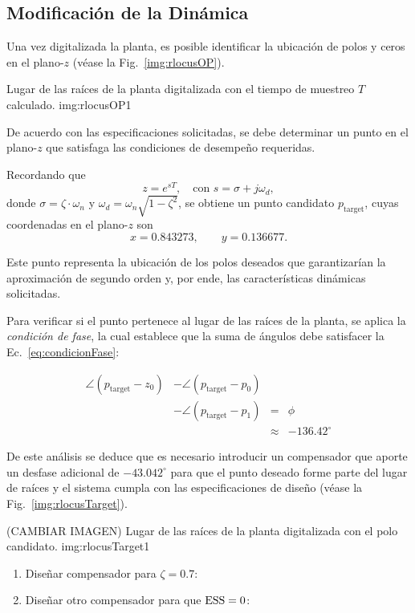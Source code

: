 \subsection{Modificaci\'on de la Din\'amica}

Una vez digitalizada la planta, es posible identificar la ubicaci\'on de polos y ceros en el plano-$z$ (v\'ease la Fig.~\ref{img:rlocusOP}).  

{Lugar de las ra\'ices de la planta digitalizada con el tiempo de muestreo $T$ calculado.}
{img:rlocusOP}{1}

De acuerdo con las especificaciones solicitadas, se debe determinar un punto en el plano-$z$ que satisfaga las condiciones de desempe\~no requeridas.  

Recordando que 
\[
z = e^{sT}, \quad \text{con } s = \sigma + j\omega_d,
\]
donde $\sigma = \zeta \cdot \omega_n$ y $\omega_d = \omega_n \sqrt{1-\zeta^2}$,
se obtiene un punto candidato $p_{\text{target}}$, cuyas coordenadas en el plano-$z$ son
\[
x = 0.843273, \qquad y = 0.136677.
\]

Este punto representa la ubicaci\'on de los polos deseados que garantizar\'ian la aproximaci\'on de segundo orden y, por ende, las caracter\'isticas din\'amicas solicitadas.  

Para verificar si el punto pertenece al lugar de las ra\'ices de la planta, se aplica la \emph{condici\'on de fase}, la cual establece que la suma de \'angulos debe satisfacer la Ec.~\eqref{eq:condicionFase}:

\begin{equation}
	\begin{aligned}
		\angle (p_{\text{target}}-z_0) 
		&- \angle (p_{\text{target}}-p_0) \\
		&- \angle (p_{\text{target}}-p_1) 
		&=& \phi \\&&\approx& -136.42^\circ
	\end{aligned}
	\label{eq:condicionFase}
\end{equation}

De este an\'alisis se deduce que es necesario introducir un compensador que aporte un desfase adicional de $-43.042^\circ$ para que el punto deseado forme parte del lugar de ra\'ices y el sistema cumpla con las especificaciones de dise\~no (v\'ease la Fig.~\ref{img:rlocusTarget}).  

(CAMBIAR IMAGEN)
{Lugar de las ra\'ices de la planta digitalizada con el polo candidato.}
{img:rlocusTarget}{1}

\begin{enumerate}[label=3.\arabic*.]
	\item Diseñar compensador para $\zeta = 0.7$: 
	\item Diseñar otro compensador para que $\mathrm{ESS} = 0$: 
\end{enumerate}
